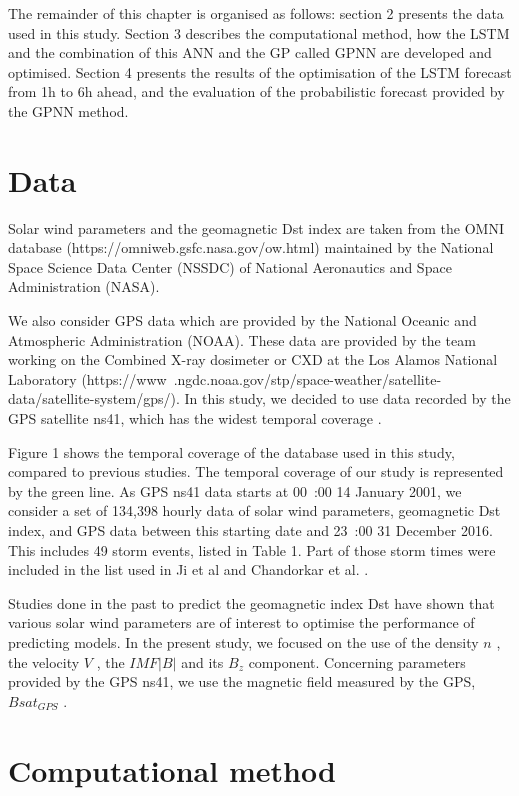 The remainder of this chapter is organised as follows: section 2 presents the data used in this study. 
Section 3 describes the computational method, how the LSTM and the combination of this ANN and the GP called 
GPNN are developed and optimised. Section 4 presents the results of the optimisation of the LSTM forecast 
from 1h to 6h ahead, and the evaluation of the probabilistic forecast provided by the GPNN method. 

\section{Data}

Solar wind parameters and the geomagnetic Dst index are taken from the OMNI database 
(https://omniweb.gsfc.nasa.gov/ow.html) maintained by the National Space Science Data Center (NSSDC) 
of National Aeronautics and Space Administration (NASA).

We also consider GPS data which are provided by the National Oceanic and Atmospheric Administration (NOAA). 
These data are provided by the team working on the Combined X-ray dosimeter or CXD at the 
Los Alamos National Laboratory (https://www .ngdc.noaa.gov/stp/space-weather/satellite-data/satellite-system/gps/). 
In this study, we decided to use data recorded by the GPS satellite ns41, which has the widest temporal coverage 
\cite{morley2017energetic}. 

Figure 1 shows the temporal coverage of the database used in this study, compared to previous studies. 
The temporal coverage of our study is represented by the green line. As GPS ns41 data starts at 
00 :00 14 January 2001, we consider a set of 134,398 hourly data of solar wind parameters, geomagnetic Dst index, 
and GPS data between this starting date and 23 :00 31 December 2016. This includes 49 storm events, listed in Table 1. 
Part of those storm times were included in the list used in Ji et al \cite{Ji2012} and 
Chandorkar et al. \cite{ChandorkarDst}. 

Studies done in the past to predict the geomagnetic index Dst have shown that various solar wind parameters 
are of interest to optimise the performance of predicting models. In the present study, we focused on the use 
of the density  \( n \) , the velocity  \( V \) , the  \( IMF \vert B \vert  \) and its  \( B_{z} \)  component. 
Concerning parameters provided by the GPS ns41, we use the magnetic field measured by the GPS,  \( Bsat_{GPS} \) .

\section{Computational method}


